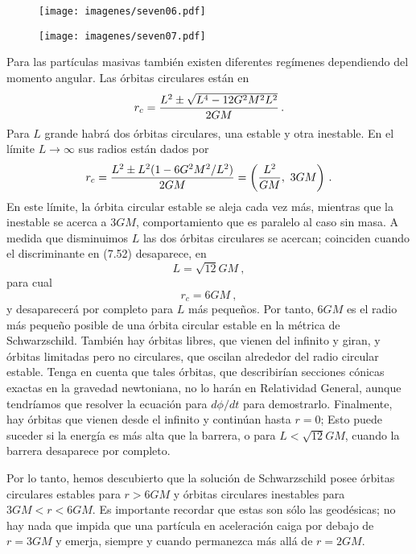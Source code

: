 \documentclass[11pt,b5paper,openany,twoside]{book}
\begin{document}
\begin{figure}[h]
\centering
\texttt{[image: imagenes/seven06.pdf]}
\end{figure}

\begin{figure}[h]
\centering
\texttt{[image: imagenes/seven07.pdf]}
\end{figure}

Para las partículas masivas también existen diferentes regímenes dependiendo del momento angular.
Las órbitas circulares están en
\begin{equation}
r_c = {{L^2\pm \sqrt{L^4 - 12 G^2 M^2 L^2}}\over{2GM}}\,.\label{7.52}
\end{equation}
Para $L$ grande habrá dos órbitas circulares, una estable y otra inestable.
En el límite $L\rightarrow\infty$ sus radios están dados por
\begin{equation}
r_c = {{L^2\pm L^2(1 - 6 G^2 M^2/L^2)}\over{2GM}} =
\left({{L^2}\over{GM}} ,\ 3GM\right)\,.\label{7.53}
\end{equation}
En este límite, la órbita circular estable se aleja cada vez más, mientras que la inestable se acerca a $3GM$, comportamiento que es paralelo al caso sin masa.
A medida que disminuimos $L$ las dos órbitas circulares se acercan; coinciden cuando el discriminante en (7.52) desaparece, en
\begin{equation}
L = \sqrt{12}GM\ ,\label{7.54}
\end{equation}
para cual
\begin{equation}
r_c = 6GM\ ,\label{7.55}
\end{equation}
y desaparecerá por completo para $L$ más pequeños.
Por tanto, $6GM$ es el radio más pequeño posible de una órbita circular estable en la métrica de Schwarzschild.
También hay órbitas libres, que vienen del infinito y giran, y órbitas limitadas pero no circulares, que oscilan alrededor del radio circular estable.
Tenga en cuenta que tales órbitas, que describirían secciones cónicas exactas en la gravedad newtoniana, no lo harán en Relatividad General, aunque tendríamos que resolver la ecuación para $d\phi/dt$ para demostrarlo.
Finalmente, hay órbitas que vienen desde el infinito y continúan hasta $r=0$; Esto puede suceder si la energía es más alta que la barrera, o para $L<\sqrt{12}GM$, cuando la barrera desaparece por completo.

Por lo tanto, hemos descubierto que la solución de Schwarzschild posee órbitas circulares estables para $r>6GM$ y órbitas circulares inestables para $3GM < r < 6GM$.
Es importante recordar que estas son sólo las geodésicas; no hay nada que impida que una partícula en aceleración caiga por debajo de $r=3GM$ y emerja, siempre y cuando permanezca más allá de $r=2GM$.
\end{document}
